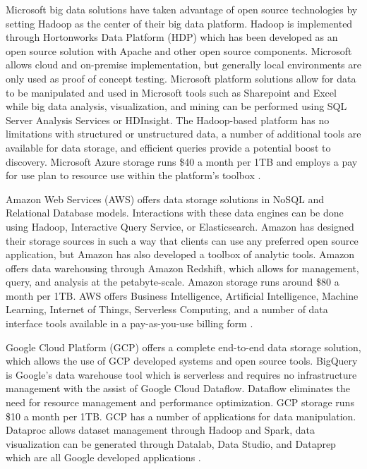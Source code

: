 \documentclass[sigconf]{acmart}
\begin{document}
Microsoft big data solutions have taken advantage of open source technologies by setting Hadoop as the center of their big data platform. Hadoop is implemented through Hortonworks Data Platform (HDP) which has been developed as an open source solution with Apache and other open source components. Microsoft allows cloud and on-premise implementation, but generally local environments are only used as proof of concept testing. Microsoft platform solutions allow for data to be manipulated and used in Microsoft tools such as Sharepoint and Excel while big data analysis, visualization, and mining can be performed using SQL Server Analysis Services or HDInsight. The Hadoop-based platform has no limitations with structured or unstructured data, a number of additional tools are available for data storage, and efficient queries provide a potential boost to discovery. Microsoft Azure storage runs \$40 a month per 1TB and employs a pay for use plan to resource use within the platform's toolbox \cite{www-msdn}.

Amazon Web Services (AWS) offers data storage solutions in NoSQL and Relational Database models. Interactions with these data engines can be done using Hadoop, Interactive Query Service, or Elasticsearch. Amazon has designed their storage sources in such a way that clients can use any preferred open source application, but Amazon has also developed a toolbox of analytic tools. Amazon offers data warehousing through Amazon Redshift, which allows for management, query, and analysis at the petabyte-scale. Amazon storage runs around \$80 a month per 1TB. AWS offers Business Intelligence, Artificial Intelligence, Machine Learning, Internet of Things, Serverless Computing, and a number of data interface tools available in a pay-as-you-use billing form \cite{www-aws}. 

Google Cloud Platform (GCP) offers a complete end-to-end data storage solution, which allows the use of GCP developed systems and open source tools. BigQuery is Google's data warehouse tool which is serverless and requires no infrastructure management with the assist of Google Cloud Dataflow. Dataflow eliminates the need for resource management and performance optimization. GCP storage runs \$10 a month per 1TB. GCP has a number of applications for data manipulation. Dataproc allows dataset management through Hadoop and Spark, data visualization can be generated through Datalab, Data Studio, and Dataprep which are all Google developed applications \cite{www-gcp}.
\end{document}
